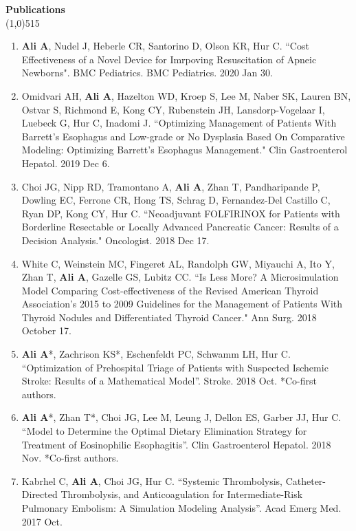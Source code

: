 \documentclass{article}
\newcommand{\s}[1]{\vspace{4mm} \noindent \large \textbf{#1} \\[-2.5mm] \linethickness{0.2mm} \line(1,0){515}}
\newcommand{\nl}{\noindent \normalsize}
\begin{document}
\s{Publications}

	\begin{enumerate}
		\item \nl \textbf{Ali A}, Nudel J, Heberle CR, Santorino D, Olson KR, Hur C. ``Cost Effectiveness of a Novel Device for Imrpoving Resuscitation of Apneic Newborns". BMC Pediatrics. BMC Pediatrics. 2020 Jan 30. 

		\item \nl Omidvari AH, \textbf{Ali A}, Hazelton WD, Kroep S, Lee M, Naber SK, Lauren BN, Ostvar S, Richmond E, Kong CY, Rubenstein JH, Lansdorp-Vogelaar I, Luebeck G, Hur C, Inadomi J. ``Optimizing Management of Patients With Barrett's Esophagus and Low-grade or No Dysplasia Based On Comparative Modeling: Optimizing Barrett's Esophagus Management." Clin Gastroenterol Hepatol. 2019 Dec 6. 

		\item \nl Choi JG, Nipp RD, Tramontano A, \textbf{Ali A}, Zhan T, Pandharipande P, Dowling EC, Ferrone CR, Hong TS, Schrag D, Fernandez-Del Castillo C, Ryan DP, Kong CY, Hur C. ``Neoadjuvant FOLFIRINOX for Patients with Borderline Resectable or Locally Advanced Pancreatic Cancer: Results of a Decision Analysis." Oncologist. 2018 Dec 17.

		\item \nl White C, Weinstein MC, Fingeret AL, Randolph GW, Miyauchi A, Ito Y, Zhan T, \textbf{Ali A}, Gazelle GS, Lubitz CC. ``Is Less More? A Microsimulation Model Comparing Cost-effectiveness of the Revised American Thyroid Association's 2015 to 2009 Guidelines for the Management of Patients With Thyroid Nodules and Differentiated Thyroid Cancer." Ann Surg. 2018 October 17.

		\item \nl \textbf{Ali A}*, Zachrison KS*, Eschenfeldt PC, Schwamm LH, Hur C. ``Optimization of Prehospital Triage of Patients with Suspected Ischemic Stroke: Results of a Mathematical Model''. Stroke. 2018 Oct. *Co-first authors.

		\item \nl \textbf{Ali A}*, Zhan T*, Choi JG, Lee M, Leung J, Dellon ES, Garber JJ, Hur C. ``Model to Determine the Optimal Dietary Elimination Strategy for Treatment of Eosinophilic Esophagitis''. Clin Gastroenterol Hepatol. 2018 Nov. *Co-first authors.
		
		\item \nl Kabrhel C, \textbf{Ali A}, Choi JG, Hur C. ``Systemic Thrombolysis, Catheter-Directed Thrombolysis, and Anticoagulation for Intermediate-Risk Pulmonary Embolism: A Simulation Modeling Analysis''. Acad Emerg Med. 2017 Oct.
		

\end{enumerate}
\end{document}

